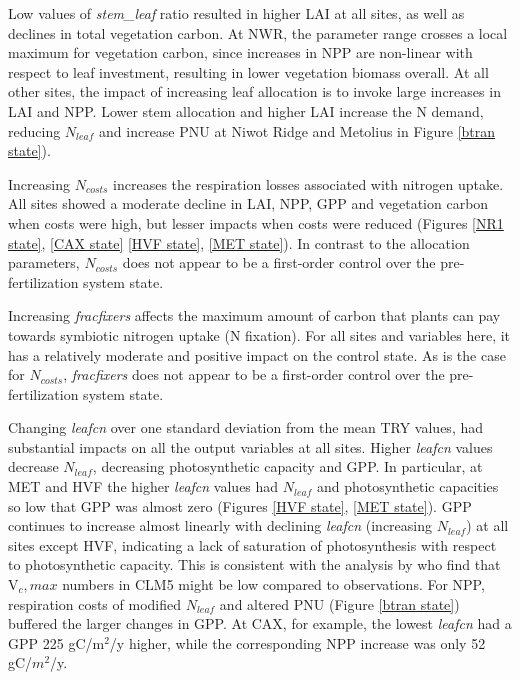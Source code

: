 \documentclass[draft,linenumbers]{agujournal}
\begin{document}
Low values of \emph{stem\_leaf} ratio resulted in higher LAI at all sites, as well as declines in total vegetation carbon. At NWR, the parameter range crosses a local maximum for vegetation carbon, since increases in NPP are non-linear with respect to leaf investment, resulting in lower vegetation biomass overall. At all other sites, the impact of increasing leaf allocation is to invoke large increases in LAI and NPP. Lower stem allocation and higher LAI increase the N demand, reducing $N_{leaf}$ and increase PNU at Niwot Ridge and Metolius in Figure \ref{btran state}). 

Increasing $N_{costs}$ increases the respiration losses associated with nitrogen uptake.  All sites showed a moderate decline in LAI, NPP, GPP and vegetation carbon when costs were high, but lesser impacts when costs were reduced (Figures \ref{NR1 state}, \ref{CAX state} \ref{HVF state}, \ref{MET state}). In contrast to the allocation parameters, $N_{costs}$ does not appear to be a first-order control over the pre-fertilization system state. 

Increasing \emph{fracfixers} affects the maximum amount of carbon that plants can pay towards symbiotic nitrogen uptake (N fixation). For all sites and variables here, it has a relatively moderate and positive impact on the control state. As is the case for $N_{costs}$, \emph{fracfixers} does not appear to be a first-order control over the pre-fertilization system state.

Changing \emph{leafcn} over one standard deviation from the mean TRY values, had substantial impacts on all the output variables at all sites. Higher \emph{leafcn} values decrease $N_{leaf}$, decreasing photosynthetic capacity and GPP.  In particular, at MET and HVF the higher \emph{leafcn} values had $N_{leaf}$ and photosynthetic capacities so low that GPP was almost zero (Figures \ref{HVF state}, \ref{MET state}).  GPP continues to increase almost linearly with declining \emph{leafcn}  (increasing $N_{leaf}$) at all sites except HVF, indicating a lack of saturation of photosynthesis with respect to photosynthetic capacity.  This is consistent with the analysis by \cite{lawrence2018} who find that V${_c,max}$ numbers in CLM5 might be low compared to observations.  For NPP, respiration costs of modified $N_{leaf}$ and altered PNU (Figure \ref{btran state}) buffered the larger changes in GPP. At CAX, for example, the lowest \emph{leafcn} had a GPP 225 gC/m$^{2}$/y higher, while the corresponding NPP increase was only 52 gC/$m^{2}$/y.
\end{document}
